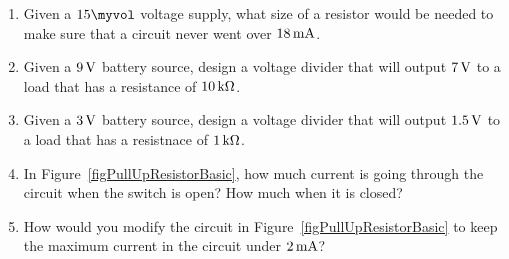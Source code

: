 \applysection

\begin{enumerate}
\item Given a $15\myvol$ voltage supply, what size of a resistor would be needed to make sure that a circuit never went over $18\,\si{\milli\ampere}$.
\item Given a $9\,\si{\volt}$ battery source, design a voltage divider that will output $7\,\si{\volt}$ to a load that has a resistance of $10\,\si{\kilo\ohm}$.
\item Given a $3\,\si{\volt}$ battery source, design a voltage divider that will output $1.5\,\si{\volt}$ to a load that has a resistnace of $1\,\si{\kilo\ohm}$.
\item In Figure~\ref{figPullUpResistorBasic}, how much current is going through the circuit when the switch is open?  How much when it is closed?
\item How would you modify the circuit in Figure~\ref{figPullUpResistorBasic} to keep the maximum current in the circuit under $2\,\si{\milli\ampere}$?
\end{enumerate}
